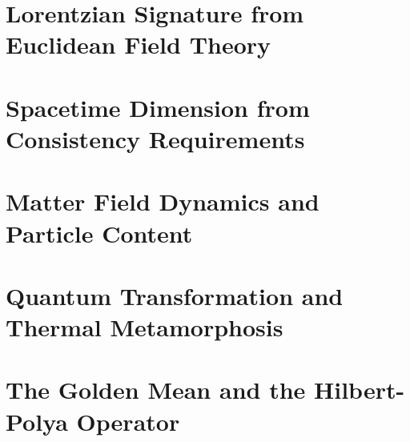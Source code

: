 \documentclass[12pt,a4paper]{article}
\begin{document}







\newpage
\section{Lorentzian Signature from Euclidean Field Theory}
\label{sec:lorentzianGeometry}





\newpage
\section{Spacetime Dimension from Consistency Requirements}
\label{sec:dimensionUniqueness}










\newpage
\section{Matter Field Dynamics and Particle Content}
\label{sec:matterFieldDynamics}




\newpage
\section{Quantum Transformation and Thermal Metamorphosis}
\label{sec:quantumPathIntegral}




\newpage
\section{The Golden Mean and the Hilbert-Polya Operator}
\label{sec:hilbertPolyaOperator}
\end{document}
